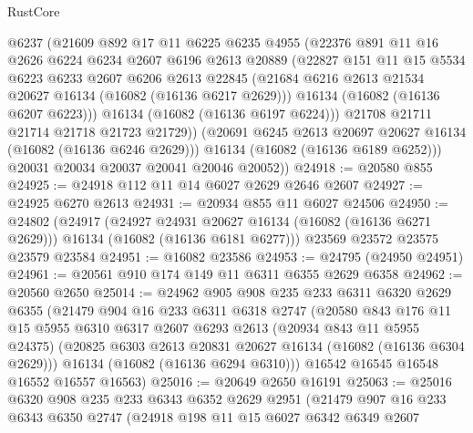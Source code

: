 \begin{lexlean}{RustCore}
\begin{coremodule}
            @6237
            (@21609
              @892
              @17
              @11
              @6225
              @6235
              @4955
              (@22376
                @891
                @11
                @16
                @2626
                @6224
                @6234
                @2607
                @6196
                @2613
                @20889
                (@22827
                  @151
                  @11
                  @15
                  @5534
                  @6223
                  @6233
                  @2607
                  @6206
                  @2613
                  @22845
                  (@21684 @6216 @2613 @21534 @20627 @16134 (@16082 (@16136 @6217 @2629)))
                  @16134
                  (@16082 (@16136 @6207 @6223)))
                @16134
                (@16082 (@16136 @6197 @6224)))
              @21708
              @21711
              @21714
              @21718
              @21723
              @21729))
          (@20691 @6245 @2613 @20697 @20627 @16134 (@16082 (@16136 @6246 @2629)))
          @16134
          (@16082 (@16136 @6189 @6252)))
        @20031
        @20034
        @20037
        @20041
        @20046
        @20052))
@24918 := @20580 @855
@24925 := @24918 @112 @11 @14 @6027 @2629 @2646 @2607
@24927 := @24925 @6270 @2613
@24931 := @20934 @855 @11 @6027 @24506
@24950 := @24802
    (@24917
      (@24927 @24931 @20627 @16134 (@16082 (@16136 @6271 @2629)))
      @16134
      (@16082 (@16136 @6181 @6277)))
    @23569
    @23572
    @23575
    @23579
    @23584
@24951 := @16082 @23586
@24953 := @24795 (@24950 @24951)
@24961 := @20561 @910 @174 @149 @11 @6311 @6355 @2629 @6358
@24962 := @20560 @2650
@25014 := @24962
    @905
    @908
    @235
    @233
    @6311
    @6320
    @2629
    @6355
    (@21479
      @904
      @16
      @233
      @6311
      @6318
      @2747
      (@20580
        @843
        @176
        @11
        @15
        @5955
        @6310
        @6317
        @2607
        @6293
        @2613
        (@20934 @843 @11 @5955 @24375)
        (@20825 @6303 @2613 @20831 @20627 @16134 (@16082 (@16136 @6304 @2629)))
        @16134
        (@16082 (@16136 @6294 @6310)))
      @16542
      @16545
      @16548
      @16552
      @16557
      @16563)
@25016 := @20649 @2650 @16191
@25063 := @25016
    @6320
    @908
    @235
    @233
    @6343
    @6352
    @2629
    @2951
    (@21479
      @907
      @16
      @233
      @6343
      @6350
      @2747
      (@24918
        @198
        @11
        @15
        @6027
        @6342
        @6349
        @2607

\end{coremodule}
\end{lexlean}
